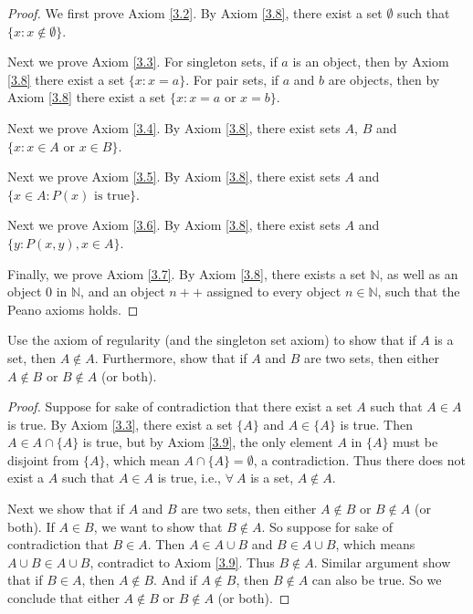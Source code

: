 \begin{proof}
We first prove Axiom \ref{3.2}.
By Axiom \ref{3.8}, there exist a set \(\emptyset\) such that \(\{x: x \notin \emptyset\}\).

Next we prove Axiom \ref{3.3}.
For singleton sets, if \(a\) is an object, then by Axiom \ref{3.8} there exist a set \(\{x: x = a\}\).
For pair sets, if \(a\) and \(b\) are objects, then by Axiom \ref{3.8} there exist a set \(\{x: x = a \text{ or } x = b\}\).

Next we prove Axiom \ref{3.4}.
By Axiom \ref{3.8}, there exist sets \(A\), \(B\) and \(\{x : x \in A \text{ or } x \in B\}\).

Next we prove Axiom \ref{3.5}.
By Axiom \ref{3.8}, there exist sets \(A\) and \(\{x \in A : P(x) \text{ is true}\}\).

Next we prove Axiom \ref{3.6}.
By Axiom \ref{3.8}, there exist sets \(A\) and \(\{y : P(x, y), x \in A\}\).

Finally, we prove Axiom \ref{3.7}.
By Axiom \ref{3.8}, there exists a set \(\mathds{N}\), as well as an object \(0\) in \(\mathds{N}\), and an object \(n++\) assigned to every object \(n \in \mathds{N}\), such that the Peano axioms holds.
\end{proof}

\begin{exercise}\label{exercise 3.2.2}
Use the axiom of regularity (and the singleton set axiom) to show that if \(A\) is a set, then \(A \notin A\).
Furthermore, show that if \(A\) and \(B\) are two sets, then either \(A \notin B\) or \(B \notin A\) (or both).
\end{exercise}

\begin{proof}
Suppose for sake of contradiction that there exist a set \(A\) such that \(A \in A\) is true.
By Axiom \ref{3.3}, there exist a set \(\{A\}\) and \(A \in \{A\}\) is true.
Then \(A \in A \cap \{A\}\) is true, but by Axiom \ref{3.9}, the only element \(A\) in \(\{A\}\) must be disjoint from \(\{A\}\), which mean \(A \cap \{A\} = \emptyset\), a contradiction.
Thus there does not exist a \(A\) such that \(A \in A\) is true, i.e., \(\forall\ A\) is a set, \(A \notin A\).

Next we show that if \(A\) and \(B\) are two sets, then either \(A \notin B\) or \(B \notin A\) (or both).
If \(A \in B\), we want to show that \(B \notin A\).
So suppose for sake of contradiction that \(B \in A\).
Then \(A \in A \cup B\) and \(B \in A \cup B\), which means \(A \cup B \in A \cup B\), contradict to Axiom \ref{3.9}.
Thus \(B \notin A\).
Similar argument show that if \(B \in A\), then \(A \notin B\).
And if \(A \notin B\), then \(B \notin A\) can also be true.
So we conclude that either \(A \notin B\) or \(B \notin A\) (or both).
\end{proof}

